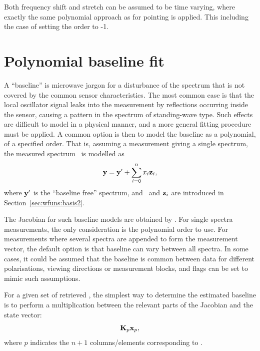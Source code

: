 Both frequency shift and stretch can be assumed to be time varying, where
exactly the same polynomial approach as for pointing is applied. This
including the case of setting the order to -1.




\section{Polynomial baseline fit}
\label{sec:wfuns:polyfit}

A ``baseline'' is microwave jargon for a disturbance of the spectrum that is
not covered by the common sensor characteristics. The most common case is that
the local oscillator signal leaks into the measurement by reflections occurring
inside the sensor, causing a pattern in the spectrum of standing-wave type.
Such effects are difficult to model in a physical manner, and a more general
fitting procedure must be applied. A common option is then to model the
baseline as a polynomial, of a specified order. That is, assuming a measurement
giving a single spectrum, the measured spectrum \MsrVct\ is modelled as
\begin{equation}
  \label{eq:polyfit}
  \mathbf{y} = \mathbf{y}' + \sum_{i=0}^n x_{i}\mathbf{z}_i,
\end{equation}
where $\mathbf{y}'$ is the ``baseline free'' spectrum, and \ and
$\mathbf{z}_i$ are introduced in Section~\ref{sec:wfuns:basis2}.

The Jacobian for such baseline models are obtained by
. For single spectra measurements, the only
consideration is the polynomial order to use. For measurements where several
spectra are appended to form the measurement vector, the default option is that
baseline can vary between all spectra. In some cases, it could be assumed that
the baseline is common between data for different polarisations, viewing
directions or measurement blocks, and flags can be set to mimic such
assumptions.

For a given set of retrieved , the simplest way to determine the
estimated baseline is to perform a multiplication between the relevant parts of
the Jacobian and the state vector:
\begin{equation}
  \mathbf{K}_{p}\mathbf{x}_{p},
  \label{eq:bline:recreate}
\end{equation}
where $p$ indicates the $n+1$ columns/elements corresponding to .


